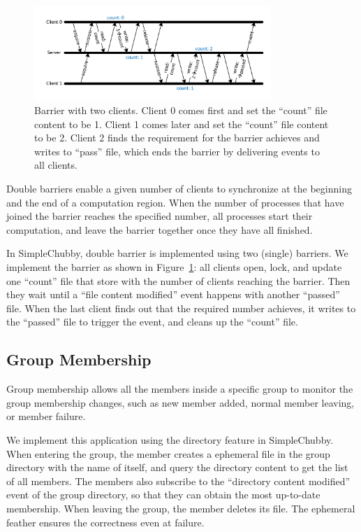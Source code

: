 \begin{figure}
\centering
\includegraphics[width=0.8\textwidth]{barrier.pdf}
\caption{Barrier with two clients. Client 0 comes first and set the ``count'' file
content to be 1. Client 1 comes later and set the ``count'' file content to be 2.
Client 2 finds the requirement for the barrier achieves and writes to ``pass'' file,
which ends the barrier by delivering events to all clients.}
\label{fig:barrier}
\end{figure}

Double barriers enable a given number of clients to synchronize at the
beginning and the end of a computation region. When the number of processes
that have joined the barrier reaches the specified number, all processes
start their computation, and leave the barrier together once they have all
finished.

In SimpleChubby, double barrier is implemented using two (single) barriers.
We implement the barrier as shown in Figure~\ref{fig:barrier}: all clients open, lock, and update
one ``count'' file that store with the number of clients reaching the barrier.
Then they wait until a ``file content modified'' event happens with another
``passed'' file. When the last client finds out that the required number
achieves, it writes to the ``passed'' file to trigger the event, and cleans
up the ``count'' file.

\subsection{Group Membership}

Group membership allows all the members inside a specific group to monitor
the group membership changes, such as new member added, normal member leaving,
or member failure.

We implement this application using the directory feature in SimpleChubby.
When entering the group, the member creates a ephemeral file in the group
directory with the name of itself, and query the directory content to get
the list of all members. The members also subscribe to the ``directory content
modified'' event of the group directory, so that they can obtain the most
up-to-date membership. When leaving the group, the member deletes its file.
The ephemeral feather ensures the correctness even at failure.



